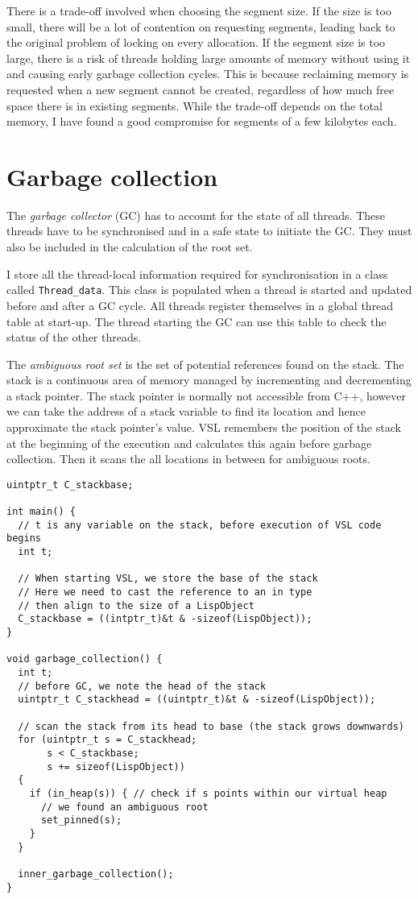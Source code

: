There is a trade-off involved when choosing the segment size. If the size is too small,
there will be a lot of contention on requesting segments, leading back to the original
problem of locking on every allocation. If the segment size is too large, there is a risk
of threads holding large amounts of memory without using it and causing early garbage collection
cycles. This is because reclaiming memory is requested when a new segment cannot be created,
regardless of how much free space there is in existing segments. While the trade-off depends on the
total memory, I have found a good compromise for segments of a few kilobytes each.

\section{Garbage collection}
\label{sec:gc}
The \emph{garbage collector} (GC) has to account for the state of all threads. These threads have to be synchronised
and in a safe state to initiate the GC. They must also be included in the calculation of the root set.

I store all the thread-local information required for synchronisation in a class called \texttt{Thread\_data}. This
class is populated when a thread is started and updated before and after a GC cycle. All threads register
themselves in a global thread table at start-up. The thread starting the GC can use this table to check the status
of the other threads.

The \emph{ambiguous root set} is the set of potential references found on the stack. The stack is a continuous area
of memory managed by incrementing and decrementing a stack pointer. The stack pointer is normally not accessible
from C++, however we can take the address of a stack variable to find its location and hence approximate the
stack pointer's value. VSL remembers the position
of the stack at the beginning of the execution and calculates this again before garbage collection. Then it
scans the all locations in between for ambiguous roots.

\begin{verbatim}
uintptr_t C_stackbase;

int main() {
  // t is any variable on the stack, before execution of VSL code begins
  int t;

  // When starting VSL, we store the base of the stack
  // Here we need to cast the reference to an in type
  // then align to the size of a LispObject
  C_stackbase = ((intptr_t)&t & -sizeof(LispObject));
}

void garbage_collection() {
  int t;
  // before GC, we note the head of the stack
  uintptr_t C_stackhead = ((uintptr_t)&t & -sizeof(LispObject));

  // scan the stack from its head to base (the stack grows downwards)
  for (uintptr_t s = C_stackhead;
       s < C_stackbase;
       s += sizeof(LispObject))
  {
    if (in_heap(s)) { // check if s points within our virtual heap
      // we found an ambiguous root
      set_pinned(s);
    }
  }

  inner_garbage_collection();
}
\end{verbatim}

